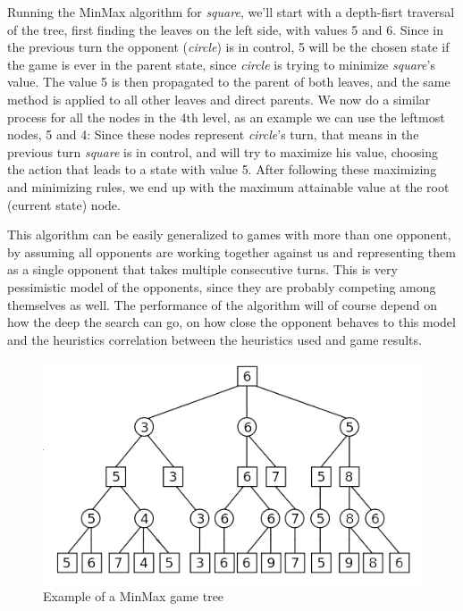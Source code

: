 Running the MinMax algorithm for \textit{square}, we'll start with a depth-fisrt traversal of the tree, first finding the leaves on the left side, with values 5 and 6. Since in the previous turn the opponent (\textit{circle}) is in control, 5 will be the chosen state if the game is ever in the parent state, since \textit{circle} is trying to minimize \textit{square}'s value. 
The value 5 is then propagated to the parent of both leaves, and the same method is applied to all other leaves and direct parents. We now do a similar process for all the nodes in the 4th level, as an example we can use the leftmost nodes, 5 and 4: Since these nodes represent \textit{circle}'s turn, that means in the previous turn \textit{square} is in control, and will try to maximize his value, choosing the action that leads to a state with value 5. After following these maximizing and minimizing rules, we end up with the maximum attainable value at the root (current state) node.

This algorithm can be easily generalized to games with more than one opponent, by assuming all opponents are working together against us and representing them as a single opponent that takes multiple consecutive turns. This is very pessimistic model of the opponents, since they are probably competing among themselves as well. The performance of the algorithm will of course depend on how the deep the search can go, on how close the opponent behaves to this model and the heuristics correlation between the heuristics used and game results.


\begin{figure}[h]
	\centering
    \includegraphics[scale=0.8]{images/min_max.png}
    \caption{Example of a MinMax game tree}
    \label{fig:min_max}
\end{figure}

